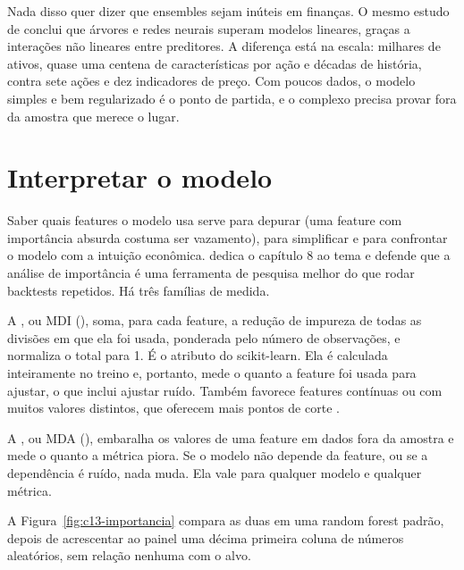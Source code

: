 Nada disso quer dizer que ensembles sejam inúteis em finanças. O mesmo estudo de \citet{gu2020} conclui que árvores e redes neurais superam modelos lineares, graças a interações não lineares entre preditores. A diferença está na escala: milhares de ativos, quase uma centena de características por ação e décadas de história, contra sete ações e dez indicadores de preço. Com poucos dados, o modelo simples e bem regularizado é o ponto de partida, e o complexo precisa provar fora da amostra que merece o lugar.

\section{Interpretar o modelo}
\label{sec:c13-interp}

Saber quais features o modelo usa serve para depurar (uma feature com importância absurda costuma ser vazamento), para simplificar e para confrontar o modelo com a intuição econômica. \citet{lopezdeprado2018} dedica o capítulo 8 ao tema e defende que a análise de importância é uma ferramenta de pesquisa melhor do que rodar backtests repetidos. Há três famílias de medida.

A , ou MDI (), soma, para cada feature, a redução de impureza de todas as divisões em que ela foi usada, ponderada pelo número de observações, e normaliza o total para 1. É o atributo  do scikit-learn. Ela é calculada inteiramente no treino e, portanto, mede o quanto a feature foi usada para ajustar, o que inclui ajustar ruído. Também favorece features contínuas ou com muitos valores distintos, que oferecem mais pontos de corte \citep{strobl2007}.

A , ou MDA (), embaralha os valores de uma feature em dados fora da amostra e mede o quanto a métrica piora. Se o modelo não depende da feature, ou se a dependência é ruído, nada muda. Ela vale para qualquer modelo e qualquer métrica.

A Figura~\ref{fig:c13-importancia} compara as duas em uma random forest padrão, depois de acrescentar ao painel uma décima primeira coluna de números aleatórios, sem relação nenhuma com o alvo.


